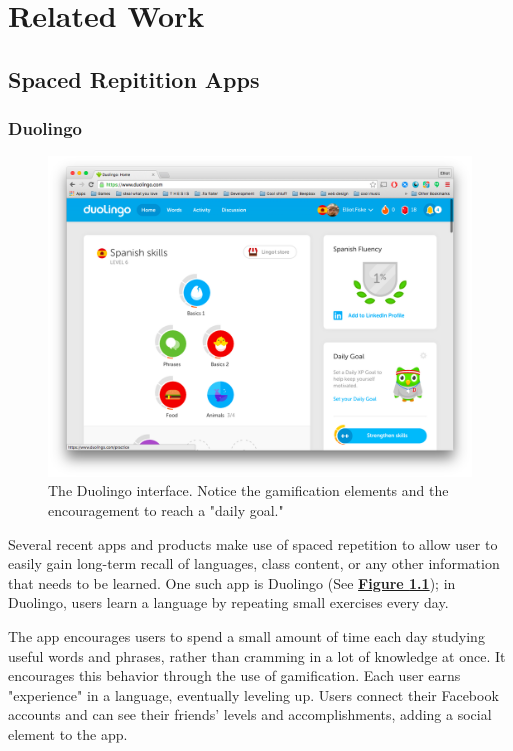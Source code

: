 \chapter{Related Work}

\section{Spaced Repitition Apps}
\subsection{Duolingo}

\begin{figure}
	\centerline{\includegraphics[width=1.2\linewidth]{duolingo}}
	\caption[Duolingo]{The Duolingo interface. Notice the gamification elements and the encouragement to reach a "daily goal."}
	\label{fig:duolingo}
\end{figure}

\par Several recent apps and products make use of spaced repetition to allow user to easily gain long-term recall of languages, class content, or any other information that needs to be learned. One such app is Duolingo (See \textbf{\hyperref[fig:duolingo]{Figure \ref*{fig:duolingo}}}); in Duolingo, users learn a language by repeating small exercises every day. 

\par The app encourages users to spend a small amount of time each day studying useful words and phrases, rather than cramming in a lot of knowledge at once. It encourages this behavior through the use of gamification. Each user earns "experience" in a language, eventually leveling up. Users connect their Facebook accounts and can see their friends' levels and accomplishments, adding a social element to the app. %

